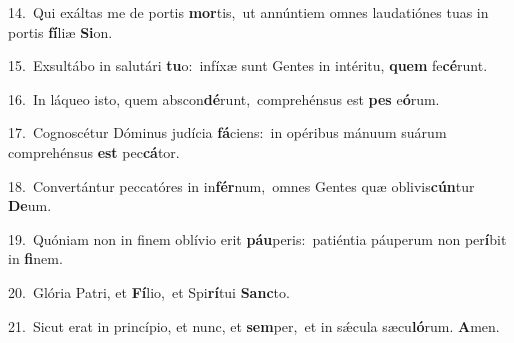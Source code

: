 {\numbfont\textcolor{\numbcolor}{14.}}~Qui exáltas me de portis \textbf{mor}\-tis,~\star ut annúntiem omnes laudatiónes tuas in portis \textbf{fí}\-liæ \textbf{Si}\-on.\par
{\numbfont\textcolor{\numbcolor}{15.}}~Exsultábo in salutári \textbf{tu}\-o:~\star infíxæ sunt Gentes in intéritu, \textbf{quem} fe\-\textbf{cé}\-runt.\par
{\numbfont\textcolor{\numbcolor}{16.}}~In láqueo isto, quem abscon\-\textbf{dé}\-runt,~\star comprehénsus est \textbf{pes} e\-\textbf{ó}\-rum.\par
{\numbfont\textcolor{\numbcolor}{17.}}~Cognoscétur Dóminus judícia \textbf{fá}\-ciens:~\star in opéribus mánuum suárum comprehénsus \textbf{est} pec\-\textbf{cá}\-tor.\par
{\numbfont\textcolor{\numbcolor}{18.}}~Convertántur peccatóres in in\-\textbf{fér}\-num,~\star omnes Gentes quæ oblivis\-\textbf{cún}\-tur \textbf{De}\-um.\par
{\numbfont\textcolor{\numbcolor}{19.}}~Quóniam non in finem oblívio erit \textbf{páu}\-peris:~\star patiéntia páuperum non per\-\textbf{í}\-bit in \textbf{fi}\-nem.\par
{\numbfont\textcolor{\numbcolor}{20.}}~Glória Patri, et \textbf{Fí}\-lio,~\star et Spi\-\textbf{rí}\-tui \textbf{Sanc}\-to.\par
{\numbfont\textcolor{\numbcolor}{21.}}~Sicut erat in princípio, et nunc, et \textbf{sem}\-per,~\star et in sǽcula sæcu\-\textbf{ló}\-rum. \textbf{A}\-men.\par

